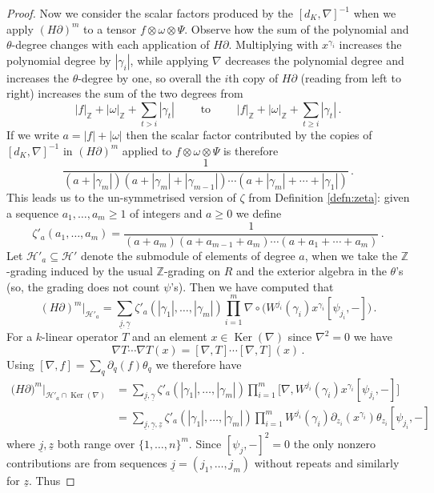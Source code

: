 \documentclass[english,letter paper,12pt,leqno]{article}
\theoremstyle{example}
\numberwithin{equation}{section}
\def\Ker{\operatorname{Ker}}
\def\be{\begin{equation}}
\def\ee{\end{equation}}
\def\nZ{\mathds{Z}}
\begin{document}
\begin{proof}
Now we consider the scalar factors produced by the $[d_K, \nabla]^{-1}$ when we apply $(H \partial)^m$ to a tensor $f \otimes \omega \otimes \Psi$. Observe how the sum of the polynomial and $\theta$-degree changes with each application of $H \partial$. Multiplying with $x^{\gamma_i}$ increases the polynomial degree by $|\gamma_i|$, while applying $\nabla$ decreases the polynomial degree and increases the $\theta$-degree by one, so overall the $i$th copy of $H \partial$ (reading from left to right) increases the sum of the two degrees from
\[
|f|_{\nZ} + |\omega|_{\nZ} + \sum_{t > i} |\gamma_t| \qquad \text{ to } \qquad |f|_{\nZ} + |\omega|_{\nZ} + \sum_{t \ge i} |\gamma_t|\,.
\]
If we write $a = |f| + |\omega|$ then the scalar factor contributed by the copies of $[d_K, \nabla]^{-1}$ in $(H \partial)^m$ applied to $f \otimes \omega \otimes \Psi$ is therefore
\[
\frac{1}{(a + |\gamma_m|)(a + |\gamma_m| + |\gamma_{m-1}|) \cdots (a + |\gamma_m| + \cdots + |\gamma_1|)}\,.
\]
This leads us to the un-symmetrised version of $\zeta$ from Definition \ref{defn:zeta}: given a sequence $a_1,\ldots,a_m \ge 1$ of integers and $a \ge 0$ we define
\be\label{defn:zeta_unsym}
\zeta'_a(a_1,\ldots,a_m) = \frac{1}{(a + a_m)(a + a_{m-1} + a_m) \cdots (a + a_1 + \cdots + a_m)}\,.
\ee
Let $\mathscr{H}'_a \subseteq \mathscr{H}'$ denote the submodule of elements of degree $a$, when we take the $\nZ$-grading induced by the usual $\nZ$-grading on $R$ and the exterior algebra in the $\theta$'s (so, the grading does not count $\psi$'s). Then we have computed that
\be
(H \partial)^m|_{\mathscr{H}'_a} = \sum_{\underline{j}, \underline{\gamma}} \zeta'_{a}( |\gamma_1|, \ldots, |\gamma_m| ) \prod_{i=1}^m \nabla \circ \big( W^{j_i}(\gamma_i)x^{\gamma_i} [ \psi_{j_i}, - ] \big) \,.
\ee
For a $k$-linear operator $T$ and an element $x \in \Ker(\nabla)$ since $\nabla^2 = 0$ we have
\[
\nabla T \cdots \nabla T (x) = [\nabla, T] \cdots [\nabla, T](x)\,.
\]
Using $[ \nabla, f ] = \sum_q \partial_q(f) \theta_q$ we therefore have
\begin{align*}
\big( H \partial )^m|_{\mathscr{H}'_a \cap \Ker(\nabla)} &= \sum_{\underline{j}, \underline{\gamma}} \zeta'_{a}( |\gamma_1|, \ldots, |\gamma_m| ) \prod_{i=1}^m \Big[ \nabla, W^{j_i}(\gamma_i)x^{\gamma_i} [ \psi_{j_i}, - ] \Big]\\
&= \sum_{\underline{j}, \underline{\gamma},\underline{z}} \zeta'_{a}( |\gamma_1|, \ldots, |\gamma_m| ) \prod_{i=1}^m W^{j_i}(\gamma_i) \partial_{z_i}(x^{\gamma_i}) \theta_{z_i} [ \psi_{j_i}, - ]
\end{align*}
where $\underline{j},\underline{z}$ both range over $\{1, \ldots, n\}^m$. Since $[ \psi_j, - ]^2 = 0$ the only nonzero contributions are from sequences $\underline{j} = (j_1,\ldots,j_m)$ without repeats and similarly for $\underline{z}$. Thus

\end{proof}
\end{document}
